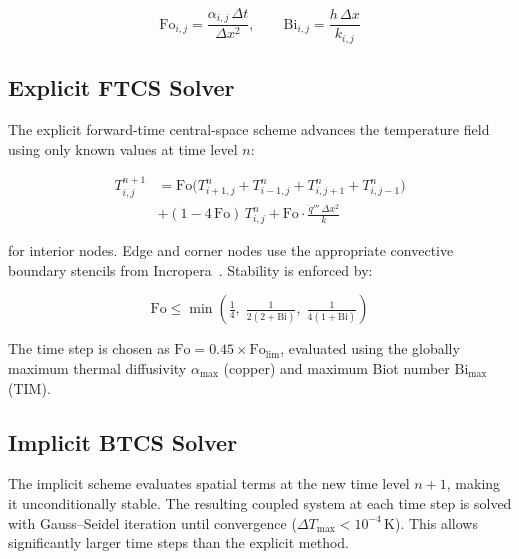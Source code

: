 \documentclass[10pt,twocolumn]{article}
\begin{document}
\begin{equation}
  \mathrm{Fo}_{i,j} = \frac{\alpha_{i,j}\,\Delta t}{\Delta x^2},
  \qquad
  \mathrm{Bi}_{i,j} = \frac{h\,\Delta x}{k_{i,j}}
  \label{eq:fo_bi}
\end{equation}

\subsection{Explicit FTCS Solver}

The explicit forward-time central-space scheme advances the temperature
field using only known values at time level $n$:

\begin{equation}
  \begin{aligned}
  T_{i,j}^{n+1} &= \mathrm{Fo}\bigl(T_{i+1,j}^n + T_{i-1,j}^n
                  + T_{i,j+1}^n + T_{i,j-1}^n\bigr) \\
                &+ (1 - 4\,\mathrm{Fo})\,T_{i,j}^n
                + \mathrm{Fo}\cdot\frac{\dot{q}'''\,\Delta x^2}{k}
  \end{aligned}
  \label{eq:explicit}
\end{equation}

for interior nodes. Edge and corner nodes use the appropriate convective
boundary stencils from Incropera~\cite{incropera2011}. Stability is
enforced by:

\begin{equation}
  \mathrm{Fo} \le \min\!\left(
    \tfrac{1}{4},\;
    \tfrac{1}{2(2+\mathrm{Bi})},\;
    \tfrac{1}{4(1+\mathrm{Bi})}
  \right)
  \label{eq:stability}
\end{equation}

The time step is chosen as $\mathrm{Fo} = 0.45 \times \mathrm{Fo}_{\lim}$,
evaluated using the globally maximum thermal diffusivity $\alpha_{\max}$
(copper) and maximum Biot number $\mathrm{Bi}_{\max}$ (TIM).

\subsection{Implicit BTCS Solver}

The implicit scheme evaluates spatial terms at the new time level $n+1$,
making it unconditionally stable. The resulting coupled system at each
time step is solved with Gauss--Seidel iteration until convergence
($\Delta T_{\max} < 10^{-4}\,\text{K}$). This allows significantly
larger time steps than the explicit method.
\end{document}
